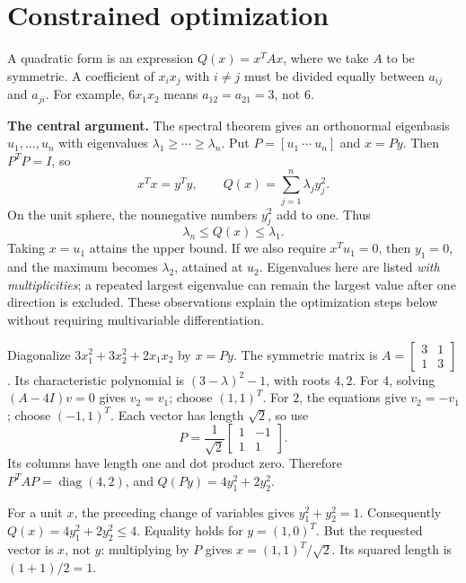 \section{Constrained optimization}
A quadratic form is an expression $Q(x)=x^TAx$, where we take $A$ to be
symmetric. A coefficient of $x_ix_j$ with $i\ne j$ must be divided equally
between $a_{ij}$ and $a_{ji}$. For example, $6x_1x_2$ means
$a_{12}=a_{21}=3$, not $6$.

\textbf{The central argument.} The spectral theorem gives an orthonormal
eigenbasis $u_1,\ldots,u_n$ with eigenvalues
$\lambda_1\ge\cdots\ge\lambda_n$. Put $P=[u_1\ \cdots\ u_n]$ and $x=Py$.
Then $P^TP=I$, so
\[
 x^Tx=y^Ty,\qquad Q(x)=\sum_{j=1}^n\lambda_j y_j^2.
\]
On the unit sphere, the nonnegative numbers $y_j^2$ add to one. Thus
\[
 \lambda_n\le Q(x)\le\lambda_1.
\]
Taking $x=u_1$ attains the upper bound. If we also require $x^Tu_1=0$,
then $y_1=0$, and the maximum becomes $\lambda_2$, attained at $u_2$.
Eigenvalues here are listed \emph{with multiplicities}; a repeated largest
eigenvalue can remain the largest value after one direction is excluded.
These observations explain the optimization steps below without requiring
multivariable differentiation.

\goal Diagonalize $3x_1^2+3x_2^2+2x_1x_2$ by $x=Py$.
The symmetric matrix is $A=\begin{bmatrix}3&1\\1&3\end{bmatrix}$.
Its characteristic polynomial is $(3-\lambda)^2-1$, with roots $4,2$.
For $4$, solving $(A-4I)v=0$ gives $v_2=v_1$; choose $(1,1)^T$.
For $2$, the equations give $v_2=-v_1$; choose $(-1,1)^T$.
Each vector has length $\sqrt2$, so use
\[
 P=\frac1{\sqrt2}\begin{bmatrix}1&-1\\1&1\end{bmatrix}.
\]
Its columns have length one and dot product zero. Therefore
$P^TAP=\operatorname{diag}(4,2)$, and $Q(Py)=4y_1^2+2y_2^2$.

For a unit $x$, the preceding change of variables gives $y_1^2+y_2^2=1$.
Consequently $Q(x)=4y_1^2+2y_2^2\le4$. Equality holds for $y=(1,0)^T$.
But the requested vector is $x$, not $y$: multiplying by $P$ gives
$x=(1,1)^T/\sqrt2$. Its squared length is $(1+1)/2=1$.

